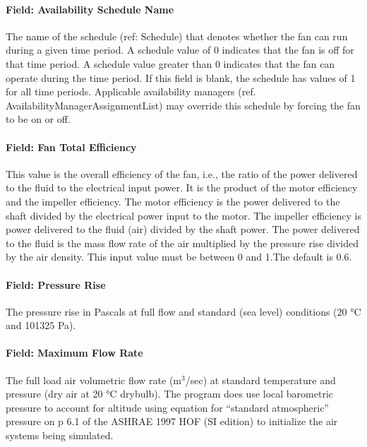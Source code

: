 \paragraph{Field: Availability Schedule Name}\label{field-availability-schedule-name-1-005}

The name of the schedule (ref: Schedule) that denotes whether the fan can run during a given time period. A schedule value of 0 indicates that the fan is off for that time period. A schedule value greater than 0 indicates that the fan can operate during the time period. If this field is blank, the schedule has values of 1 for all time periods. Applicable availability managers (ref. AvailabilityManagerAssignmentList) may override this schedule by forcing the fan to be on or off.

\paragraph{Field: Fan Total Efficiency}\label{field-fan-total-efficiency-1-000}

This value is the overall efficiency of the fan, i.e., the ratio of the power delivered to the fluid to the electrical input power. It is the product of the motor efficiency and the impeller efficiency. The motor efficiency is the power delivered to the shaft divided by the electrical power input to the motor. The impeller efficiency is power delivered to the fluid (air) divided by the shaft power. The power delivered to the fluid is the mass flow rate of the air multiplied by the pressure rise divided by the air density. This input value must be between 0 and 1.The default is 0.6.

\paragraph{Field: Pressure Rise}\label{field-pressure-rise-1}

The pressure rise in Pascals at full flow and standard (sea level) conditions (20 °C and 101325 Pa).

\paragraph{Field: Maximum Flow Rate}\label{field-maximum-flow-rate-1}

The full load air volumetric flow rate (m\(^{3}\)/sec) at standard temperature and pressure (dry air at 20 °C drybulb). The program does use local barometric pressure to account for altitude using equation for ``standard atmospheric'' pressure on p 6.1 of the ASHRAE 1997 HOF (SI edition) to initialize the air systems being simulated.

